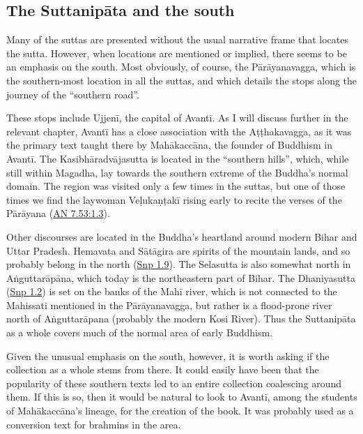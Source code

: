 \documentclass[12pt,openany]{book}%
\begin{document}
\subsection*{The \textsanskrit{Suttanipāta} and the south}

Many of the suttas are presented without the usual narrative frame that locates the sutta. However, when locations are mentioned or implied, there seems to be an emphasis on the south. Most obviously, of course, the \textsanskrit{Pārāyanavagga}, which is the southern-most location in all the suttas, and which details the stops along the journey of the “southern road”.

These stops include \textsanskrit{Ujjenī}, the capital of \textsanskrit{Avantī}. As I will discuss further in the relevant chapter, \textsanskrit{Avantī} has a close association with the \textsanskrit{Aṭṭhakavagga}, as it was the primary text taught there by \textsanskrit{Mahākaccāna}, the founder of Buddhism in \textsanskrit{Avantī}. The \textsanskrit{Kasibhāradvājasutta} is located in the “southern hills”, which, while still within Magadha, lay towards the southern extreme of the Buddha’s normal domain. The region was visited only a few times in the suttas, but one of those times we find the laywoman \textsanskrit{Veḷukaṇṭakī} rising early to recite the verses of the \textsanskrit{Pārāyana} (\href{https://suttacentral.net/an7.53/en/sujato\#1.3}{AN 7.53:1.3}).

Other discourses are located in the Buddha’s heartland around modern Bihar and Uttar Pradesh. Hemavata and \textsanskrit{Sātāgira} are spirits of the mountain lands, and so probably belong in the north (\href{https://suttacentral.net/snp1.9/en/sujato}{Snp 1.9}). The Selasutta is also somewhat north in \textsanskrit{Aṅguttarāpāna}, which today is the northeastern part of Bihar. The Dhaniyasutta (\href{https://suttacentral.net/snp1.2/en/sujato}{Snp 1.2}) is set on the banks of the \textsanskrit{Mahī} river, which is not connected to the Mahissati mentioned in the \textsanskrit{Pārāyanavagga}, but rather is a flood-prone river north of \textsanskrit{Aṅguttarāpana} (probably the modern Kosi River). Thus the \textsanskrit{Suttanipāta} as a whole covers much of the normal area of early Buddhism.

Given the unusual emphasis on the south, however, it is worth asking if the collection as a whole stems from there. It could easily have been that the popularity of these southern texts led to an entire collection coalescing around them. If this is so, then it would be natural to look to \textsanskrit{Avantī}, among the students of \textsanskrit{Mahākaccāna}’s lineage, for the creation of the book. It was probably used as a conversion text for brahmins in the area.
\end{document}
